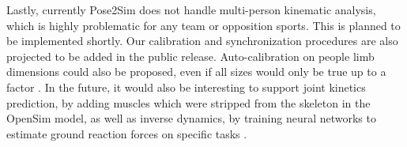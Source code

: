 Lastly, currently Pose2Sim does not handle multi-person kinematic analysis, which is highly problematic for any team or opposition sports. This is planned to be implemented shortly. Our calibration and synchronization procedures are also projected to be added in the public release. Auto-calibration on people limb dimensions could also be proposed, even if all sizes would only be true up to a factor \cite{Liu2022a}. In the future, it would also be interesting to support joint kinetics prediction, by adding muscles which were stripped from the skeleton in the OpenSim model, as well as inverse dynamics, by training neural networks to estimate ground reaction forces on specific tasks \cite{Oh2013, Johnson2018, Mundt2019, Uhlrich2022}.
















